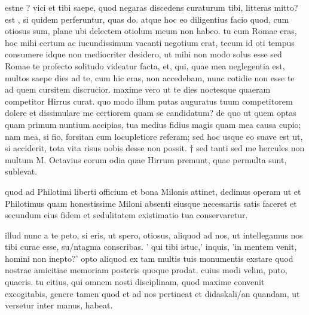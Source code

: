 


 estne ? vici et tibi saepe, quod negaras discedens curaturum tibi, litteras mitto? est , si quidem perferuntur, quas do. atque hoc eo diligentius facio quod, cum otiosus sum, plane ubi delectem otiolum meum non habeo. tu cum Romae eras, hoc mihi certum ac iucundissimum vacanti negotium erat, tecum id oti tempus consumere idque non mediocriter desidero, ut mihi non modo solus esse sed Romae te profecto solitudo videatur facta, et, qui, quae mea neglegentia est, multos saepe dies ad te, cum hic eras, non accedebam, nunc cotidie non esse te ad quem cursitem discrucior. maxime vero ut te dies noctesque quaeram competitor Hirrus curat. quo modo illum putas auguratus tuum competitorem dolere et dissimulare me certiorem quam se candidatum? de quo ut quem optas quam primum nuntium accipias, tua medius fidius magis quam mea causa cupio; nam mea, si fio, forsitan cum locupletiore referam; sed hoc usque eo suave est ut, si acciderit, tota vita risus nobis desse non possit. † sed tanti sed me hercules non multum M. Octavius eorum odia quae Hirrum premunt, quae permulta sunt, sublevat.

 quod ad Philotimi liberti officium et bona Milonis attinet, dedimus operam ut et Philotimus quam honestissime Miloni absenti eiusque necessariis satis faceret et secundum eius fidem et sedulitatem existimatio tua conservaretur.

 illud nunc a te peto, si eris, ut spero, otiosus, aliquod ad nos, ut intellegamus nos tibi curae esse, su/ntagma conscribas. ' qui tibi istuc,' inquis, 'in mentem venit, homini non inepto?' opto aliquod ex tam multis tuis monumentis exstare quod nostrae amicitiae memoriam posteris quoque prodat. cuius modi velim, puto, quaeris. tu citius, qui omnem nosti disciplinam, quod maxime convenit excogitabis, genere tamen quod et ad nos pertineat et didaskali/an quandam, ut versetur inter manus, habeat.

